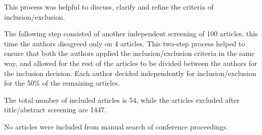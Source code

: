 This process was helpful to discuss, clarify and refine the criteria of inclusion/exclusion.

The following step consisted of another independent screening of 100 articles, this time the authors disagreed only on 4 articles. This two-step process helped to ensure that both the authors applied the inclusion/exclusion criteria in the same way, and allowed for the rest of the articles to be divided between the authors for the inclusion decision. Each author decided independently for inclusion/exclusion for the 50\% of the remaining articles.

The total number of included articles is 54, while the articles excluded after title/abstract screening are 1447.

No articles were included from manual search of conference proceedings.